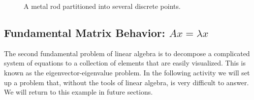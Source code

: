 \begin{problem}
    \begin{figure}[ht!]
        \begin{center}
        \end{center}
        \caption{A metal rod partitioned into several discrete points.}
        \label{fig:10.1.rod}
    \end{figure}
\end{problem}

\subsection*{Fundamental Matrix Behavior: $Ax = \lambda x$}
The second fundamental problem of linear algebra is to decompose a complicated system of
equations to a collection of elements that are easily visualized.  This is known as the
eigenvector-eigenvalue problem.  In the following activity we will set up a problem that,
without the tools of linear algebra, is very difficult to answer.  We will return to this
example in future sections.

